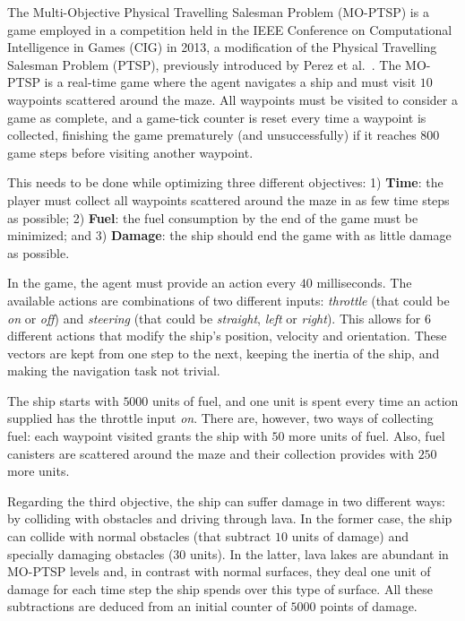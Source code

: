 \documentclass[journal]{IEEEtran}
\begin{document}
The Multi-Objective Physical Travelling Salesman Problem (MO-PTSP) is a game employed in a competition held in the IEEE Conference on Computational Intelligence in Games (CIG) in 2013, a modification of the Physical Travelling Salesman Problem (PTSP), previously introduced by Perez et al.~\cite{PerezCEC2012}. The MO-PTSP is a real-time game where the agent navigates a ship and must visit $10$ waypoints scattered around the maze. All waypoints must be visited to consider a game as complete, and a game-tick counter is reset every time a waypoint is collected, finishing the game prematurely (and unsuccessfully) if it reaches $800$ game steps before visiting another waypoint.

This needs to be done while optimizing three different objectives:  1) \textbf{Time}: the player must collect all waypoints scattered around the maze in as few time steps as possible; 2) \textbf{Fuel}: the fuel consumption by the end of the game must be minimized; and 3) \textbf{Damage}: the ship should end the game with as little damage as possible.

In the game, the agent must provide an action every $40$ milliseconds. The available actions are combinations of two different inputs: \textit{throttle} (that could be \textit{on} or \textit{off}) and \textit{steering} (that could be \textit{straight}, \textit{left} or \textit{right}). This allows for $6$ different actions that modify the ship's position, velocity and orientation. These vectors are kept from one step to the next, keeping the inertia of the ship, and making the navigation task not trivial. 

The ship starts with $5000$ units of fuel, and one unit is spent every time an action supplied has the throttle input \textit{on}. There are, however, two ways of collecting fuel: each waypoint visited grants the ship with $50$ more units of fuel. Also, fuel canisters are scattered around the maze and their collection provides with $250$ more units.

Regarding the third objective, the ship can suffer damage in two different ways: by colliding with obstacles and driving through lava. In the former case, the ship can collide with normal obstacles (that subtract $10$ units of damage) and specially damaging obstacles ($30$ units). In the latter, lava lakes are abundant in MO-PTSP levels and, in contrast with normal surfaces, they deal one unit of damage for each time step the ship spends over this type of surface. All these subtractions are deduced from an initial counter of $5000$ points of damage.
\end{document}
